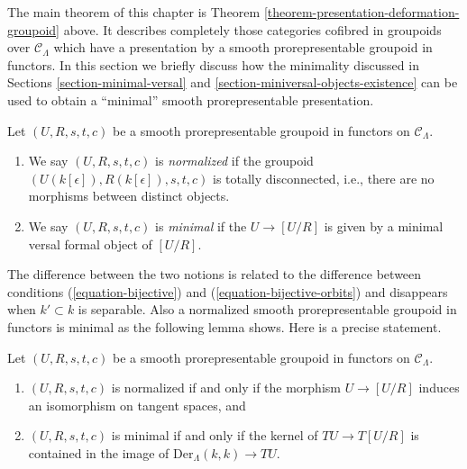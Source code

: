 \noindent
The main theorem of this chapter is
Theorem \ref{theorem-presentation-deformation-groupoid}
above. It describes completely those categories cofibred in groupoids
over $\mathcal{C}_\Lambda$ which have a presentation by a
smooth prorepresentable groupoid in functors. In this section we briefly
discuss how the minimality discussed in
Sections \ref{section-minimal-versal} and
\ref{section-miniversal-objects-existence}
can be used to obtain a ``minimal'' smooth prorepresentable presentation.

\begin{definition}
\label{definition-minimal-groupoid-in-functors}
Let $(U, R, s, t, c)$ be a smooth prorepresentable groupoid in functors
on $\mathcal{C}_\Lambda$.
\begin{enumerate}
\item We say $(U, R, s, t, c)$ is {\it normalized} if the groupoid
$(U(k[\epsilon]), R(k[\epsilon]), s, t, c)$ is totally disconnected,
i.e., there are no morphisms between distinct objects.
\item We say $(U, R, s, t, c)$ is {\it minimal} if the $U \to [U/R]$
is given by a minimal versal formal object of $[U/R]$.
\end{enumerate}
\end{definition}

\noindent
The difference between the two notions is related to the difference between
conditions (\ref{equation-bijective}) and (\ref{equation-bijective-orbits})
and disappears when $k' \subset k$ is separable. Also a
normalized smooth prorepresentable groupoid in functors is minimal
as the following lemma shows. Here is a precise statement.

\begin{lemma}
\label{lemma-characterize-minimal-groupoid-in-functors}
Let $(U, R, s, t, c)$ be a smooth prorepresentable groupoid in
functors on $\mathcal{C}_\Lambda$.
\begin{enumerate}
\item $(U, R, s, t, c)$ is normalized if and only if the morphism
$U \to [U/R]$ induces an isomorphism on tangent spaces, and
\item $(U, R, s, t, c)$ is minimal if and only if the kernel of
$TU \to T[U/R]$ is contained in the image of
$\text{Der}_\Lambda(k, k) \to TU$.
\end{enumerate}
\end{lemma}

